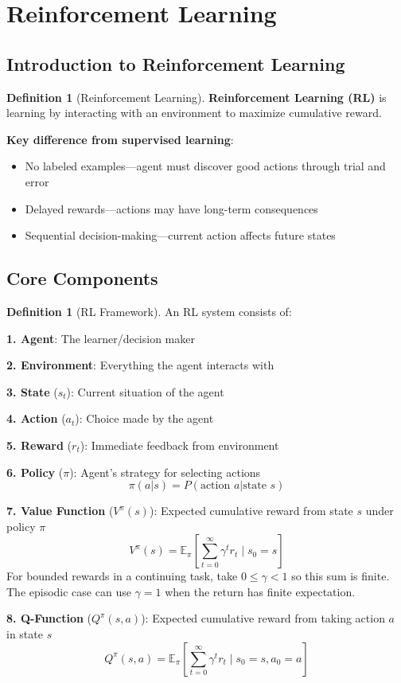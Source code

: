 \documentclass[11pt,twoside]{article}
\numberwithin{equation}{section}
\newcommand{\E}{\mathbb{E}}
\theoremstyle{plain}
\theoremstyle{definition}
\newtheorem{definition}[theorem]{Definition}
\theoremstyle{remark}
\begin{document}
\section{Reinforcement Learning}
\label{sec:reinforcement-learning}

\subsection{Introduction to Reinforcement Learning}

\begin{definition}[Reinforcement Learning]
\textbf{Reinforcement Learning (RL)} is learning by interacting with an environment to maximize cumulative reward.

\textbf{Key difference from supervised learning}:
\begin{itemize}
\item No labeled examples---agent must discover good actions through trial and error
\item Delayed rewards---actions may have long-term consequences
\item Sequential decision-making---current action affects future states
\end{itemize}
\end{definition}

\subsection{Core Components}

\begin{definition}[RL Framework]
An RL system consists of:

\textbf{1. Agent}: The learner/decision maker

\textbf{2. Environment}: Everything the agent interacts with

\textbf{3. State} ($s_t$): Current situation of the agent

\textbf{4. Action} ($a_t$): Choice made by the agent

\textbf{5. Reward} ($r_t$): Immediate feedback from environment

\textbf{6. Policy} ($\pi$): Agent's strategy for selecting actions
\[
\pi(a|s) = P(\text{action } a | \text{state } s)
\]

\textbf{7. Value Function} ($V^\pi(s)$): Expected cumulative reward from state $s$ under policy $\pi$
\[
V^\pi(s) = \E_\pi\left[\sum_{t=0}^\infty \gamma^t r_t \mid s_0 = s\right]
\]
For bounded rewards in a continuing task, take $0\leq\gamma<1$ so this sum is finite. The episodic case can use $\gamma=1$ when the return has finite expectation.

\textbf{8. Q-Function} ($Q^\pi(s,a)$): Expected cumulative reward from taking action $a$ in state $s$
\[
Q^\pi(s,a) = \E_\pi\left[\sum_{t=0}^\infty \gamma^t r_t \mid s_0 = s, a_0 = a\right]
\]
\end{definition}
\end{document}
